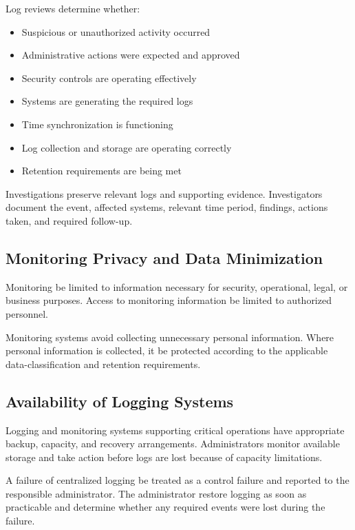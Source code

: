 Log reviews \should{} determine whether:
\begin{itemize}
    \item Suspicious or unauthorized activity occurred
    \item Administrative actions were expected and approved
    \item Security controls are operating effectively
    \item Systems are generating the required logs
    \item Time synchronization is functioning
    \item Log collection and storage are operating correctly
    \item Retention requirements are being met
\end{itemize}

Investigations \must{} preserve relevant logs and supporting evidence. Investigators \should{} document the event, affected systems, relevant time period, findings, actions taken, and required follow-up.

\subsection{Monitoring Privacy and Data Minimization}

Monitoring \must{} be limited to information necessary for security, operational, legal, or business purposes. Access to monitoring information \must{} be limited to authorized personnel.

Monitoring systems \should{} avoid collecting unnecessary personal information. Where personal information is collected, it \must{} be protected according to the applicable data-classification and retention requirements.

\subsection{Availability of Logging Systems}

Logging and monitoring systems supporting critical operations \should{} have appropriate backup, capacity, and recovery arrangements. Administrators \must{} monitor available storage and take action before logs are lost because of capacity limitations.

A failure of centralized logging \must{} be treated as a control failure and reported to the responsible administrator. The administrator \must{} restore logging as soon as practicable and determine whether any required events were lost during the failure.

